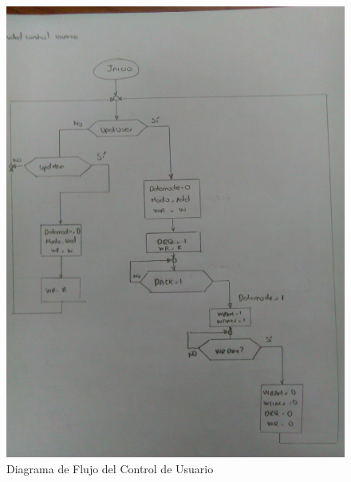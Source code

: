 \documentclass[12pt,a4paper]{report}
\begin{document}
\begin{figure}[hbtp]
	\centering
	\includegraphics[width=15cm]{Img/ControlUsuarioFlujo.jpg}
	\caption{Diagrama de Flujo del Control de Usuario}
	\label{fig:FlujoUsuario1}
\end{figure}
\end{document}
